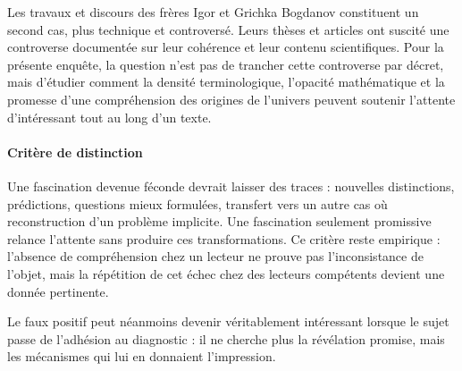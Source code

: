 \documentclass[10pt,a4paper]{article}
\begin{document}
Les travaux et discours des frères Igor et Grichka Bogdanov constituent un second cas, plus technique et controversé. Leurs thèses et articles ont suscité une controverse documentée sur leur cohérence et leur contenu scientifiques. Pour la présente enquête, la question n'est pas de trancher cette controverse par décret, mais d'étudier comment la densité terminologique, l'opacité mathématique et la promesse d'une compréhension des origines de l'univers peuvent soutenir l'attente d'intéressant tout au long d'un texte.

\paragraph{Critère de distinction}
Une fascination devenue féconde devrait laisser des traces : nouvelles distinctions, prédictions, questions mieux formulées, transfert vers un autre cas où reconstruction d'un problème implicite. Une fascination seulement promissive relance l'attente sans produire ces transformations. Ce critère reste empirique : l'absence de compréhension chez un lecteur ne prouve pas l'inconsistance de l'objet, mais la répétition de cet échec chez des lecteurs compétents devient une donnée pertinente.

Le faux positif peut néanmoins devenir véritablement intéressant lorsque le sujet passe de l'adhésion au diagnostic : il ne cherche plus la révélation promise, mais les mécanismes qui lui en donnaient l'impression.
\end{document}
